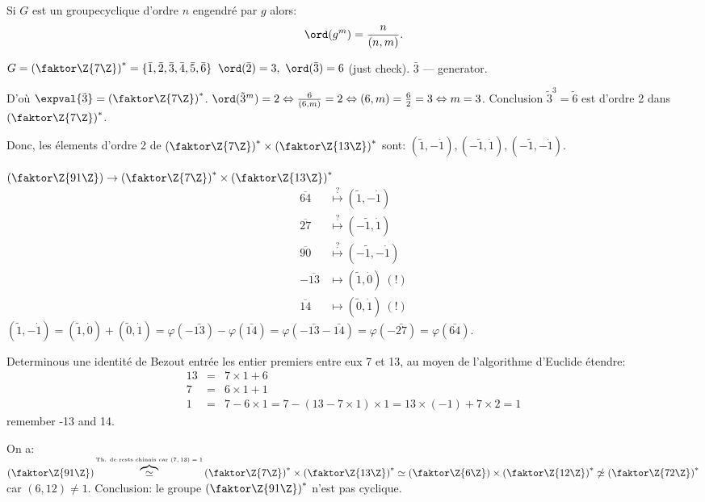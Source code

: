 \begin{rappel}
	Si $G$ est un groupecyclique d'ordre $n$ engendré par $g$ alors:
	$$\ord(g^m)=\frac n{(n,m)}.$$
	\begin{remark}
		$G=\left(\faktor\Z{7\Z}\right)^\ast=\{\bar 1, \bar 2, \bar 3,\bar 4,\bar 5,\bar 6\}$
		$\ord(\bar 2)=3,\ \ord(\bar 3)=6$ (just check). $\bar 3$ --- generator.
	\end{remark}
	D'où $\expval{\tilde 3}=\left(\faktor\Z{7\Z}\right)^\ast$.
	$\ord(\tilde 3^m)=2\Leftrightarrow \frac 6{(6,m)}=2\Leftrightarrow (6,m)=\frac 62 = 3 \Leftrightarrow m=3$. Conclusion $\tilde 3^3=\tilde 6$ est d'ordre 2 dans $\left(\faktor\Z{7\Z}\right)^\ast$.
	
	Donc, les élements d'ordre 2 de $\left(\faktor\Z{7\Z}\right)^\ast\times\left(\faktor\Z{13\Z}\right)^\ast$ sont: $(\tilde 1, -\dot 1),(-\tilde 1, \dot 1),(-\tilde 1, -\dot 1)$. 
	
	$\left(\faktor\Z{91\Z}\right)\rightarrow\left(\faktor\Z{7\Z}\right)^\ast\times\left(\faktor\Z{13\Z}\right)^\ast$
	\begin{align*}
		\overline{64}  &\overset{?}{\mapsto} (\tilde 1, -\dot 1)\\
		\overline{27}  &\overset{?}{\mapsto} (-\tilde 1, \dot 1)\\
		\overline{90}  &\overset{?}{\mapsto} (-\tilde 1, -\dot 1)\\
		-\overline{13}  &\mapsto (\tilde 1, \dot 0)\ (!)\\
		\overline{14}  &\mapsto (\tilde 0, \dot 1)\ (!)
	\end{align*}
	$(\tilde 1, -\dot 1)=(\tilde 1, \dot 0)+(\tilde 0, \dot 1)=\varphi (-\bar{13})-\varphi (\bar{14})=\varphi (-\bar{13}-\bar{14})=\varphi (-\bar{27})=\varphi (\bar{64})$.
	
	Determinous une identité de Bezout entrée les entier premiers entre eux 7 et 13, au moyen de l'algorithme d'Euclide étendre:
	\begin{align*}
		13 &=& 7\times 1+ 6\\
		7 &=& 6\times 1+1\\
		1 &=& 7-6\times 1=7-(13-7\times 1)\times 1=13\times (-1)+7\times 2=1
	\end{align*}
	remember -13 and 14.
\end{rappel}

\begin{remark}
	On a: $\left(\faktor\Z{91\Z}\right)\overbrace{\simeq}^{\mbox{\tiny Th. de rests chinois car $(7,13)=1$}} \left(\faktor\Z{7\Z}\right)^\ast\times \left(\faktor\Z{13\Z}\right)^\ast\simeq \left(\faktor\Z{6\Z}\right)\times \left(\faktor\Z{12\Z}\right)^\ast\not\simeq \left(\faktor\Z{72\Z}\right)^\ast$ car $(6,12)\neq 1$. Conclusion: le groupe $\left(\faktor\Z{91\Z}\right)^\ast$ n'est pas cyclique.
\end{remark}

